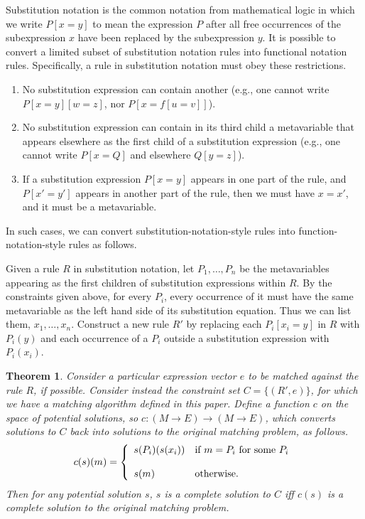 \documentclass{article}
\newtheorem{thm}{Theorem}
\begin{document}
Substitution notation is the common notation from mathematical logic in which we write $P[x=y]$ to mean the expression $P$ after all free occurrences of the subexpression $x$ have been replaced by the subexpression $y$.  It is possible to convert a limited subset of substitution notation rules into functional notation rules.  Specifically, a rule in substitution notation must obey these restrictions.
\begin{enumerate}
\item	No substitution expression can contain another (e.g., one cannot write $P[x=y][w=z]$, nor $P[x=f[u=v]]$).
\item	No substitution expression can contain in its third child a metavariable that appears elsewhere as the first child of a substitution expression (e.g., one cannot write $P[x=Q]$ and elsewhere $Q[y=z]$).
\item	If a substitution expression $P[x=y]$ appears in one part of the rule, and $P[x'=y']$ appears in another part of the rule, then we must have $x=x'$, and it must be a metavariable.
\end{enumerate}
In such cases, we can convert substitution-notation-style rules into function-notation-style rules as follows.

Given a rule $R$ in substitution notation, let $P_1,\ldots,P_n$ be the metavariables appearing as the first children of substitution expressions within $R$.  By the constraints given above, for every $P_i$, every occurrence of it must have the same metavariable as the left hand side of its substitution equation.  Thus we can list them, $x_1,\ldots,x_n$.  Construct a new rule $R'$ by replacing each $P_i[x_i=y]$ in $R$ with $P_i(y)$ and each occurrence of a $P_i$ outside a substitution expression with $P_i(x_i)$.

\begin{thm}\label{T:c}
Consider a particular expression vector $e$ to be matched against the rule $R$, if possible.  Consider instead the constraint set $C=\{(R',e)\}$, for which we have a matching algorithm defined in this paper.  Define a function $c$ on the space of potential solutions, so $c:(M\to E)\to(M\to E)$, which converts solutions to $C$ back into solutions to the original matching problem, as follows.
	$$	c(s)(m)=\left\{
			\begin{array}{l l}
				s(P_i)(s(x_i)) & \text{if $m=P_i$ for some $P_i$} \\
				  &   \\
				s(m) & \text{otherwise.}
			\end{array}
		\right.	$$
Then for any potential solution $s$, $s$ is a complete solution to $C$ iff $c(s)$ is a complete solution to the original matching problem.
\end{thm}
\end{document}
